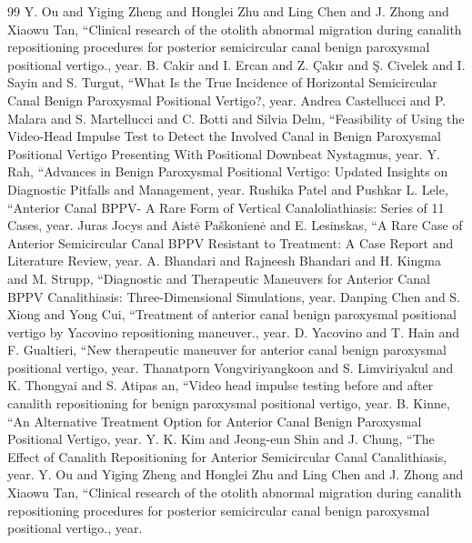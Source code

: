 \documentclass[11pt]{article}
\begin{document}
\begin{thebibliography}{99}
 Y. Ou and Yiging Zheng and Honglei Zhu and Ling Chen and J. Zhong and Xiaowu Tan, ``Clinical research of the otolith abnormal migration during canalith repositioning procedures for posterior semicircular canal benign paroxysmal positional vertigo., {year}.
 B. Cakir and I. Ercan and Z. Çakır and Ş. Civelek and I. Sayin and S. Turgut, ``What Is the True Incidence of Horizontal Semicircular Canal Benign Paroxysmal Positional Vertigo?, {year}.
 Andrea Castellucci and P. Malara and S. Martellucci and C. Botti and Silvia Delm, ``Feasibility of Using the Video-Head Impulse Test to Detect the Involved Canal in Benign Paroxysmal Positional Vertigo Presenting With Positional Downbeat Nystagmus, {year}.
 Y. Rah, ``Advances in Benign Paroxysmal Positional Vertigo: Updated Insights on Diagnostic Pitfalls and Management, {year}.
 Rushika Patel and Pushkar L. Lele, ``Anterior Canal BPPV- A Rare Form of Vertical Canaloliathiasis: Series of 11 Cases, {year}.
 Juras Jocys and Aistė Paškonienė and E. Lesinskas, ``A Rare Case of Anterior Semicircular Canal BPPV Resistant to Treatment: A Case Report and Literature Review, {year}.
 A. Bhandari and Rajneesh Bhandari and H. Kingma and M. Strupp, ``Diagnostic and Therapeutic Maneuvers for Anterior Canal BPPV Canalithiasis: Three-Dimensional Simulations, {year}.
 Danping Chen and S. Xiong and Yong Cui, ``Treatment of anterior canal benign paroxysmal positional vertigo by Yacovino repositioning maneuver., {year}.
 D. Yacovino and T. Hain and F. Gualtieri, ``New therapeutic maneuver for anterior canal benign paroxysmal positional vertigo, {year}.
 Thanatporn Vongviriyangkoon and S. Limviriyakul and K. Thongyai and S. Atipas an, ``Video head impulse testing before and after canalith repositioning for benign paroxysmal positional vertigo, {year}.
 B. Kinne, ``An Alternative Treatment Option for Anterior Canal Benign Paroxysmal Positional Vertigo, {year}.
 Y. K. Kim and Jeong-eun Shin and J. Chung, ``The Effect of Canalith Repositioning for Anterior Semicircular Canal Canalithiasis, {year}.
 Y. Ou and Yiging Zheng and Honglei Zhu and Ling Chen and J. Zhong and Xiaowu Tan, ``Clinical research of the otolith abnormal migration during canalith repositioning procedures for posterior semicircular canal benign paroxysmal positional vertigo., {year}.
\end{thebibliography}
\end{document}
